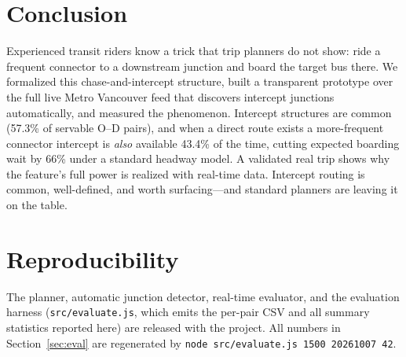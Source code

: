 \documentclass[conference]{IEEEtran}
\begin{document}
\section{Conclusion}
Experienced transit riders know a trick that trip planners do not show: ride a
frequent connector to a downstream junction and board the target bus there. We
formalized this chase-and-intercept structure, built a transparent prototype over
the full live Metro Vancouver feed that discovers intercept junctions
automatically, and measured the phenomenon. Intercept structures are common
(57.3\% of servable O--D pairs), and when a direct route exists a more-frequent
connector intercept is \emph{also} available 43.4\% of the time, cutting expected
boarding wait by 66\% under a standard headway model. A validated real trip shows
why the feature's full power is realized with real-time data. Intercept routing is
common, well-defined, and worth surfacing---and standard planners are leaving it
on the table.

\section*{Reproducibility}
The planner, automatic junction detector, real-time evaluator, and the evaluation
harness (\texttt{src/evaluate.js}, which emits the per-pair CSV and all summary
statistics reported here) are released with the project. All numbers in
Section~\ref{sec:eval} are regenerated by
\texttt{node src/evaluate.js 1500 20261007 42}.



\end{document}
